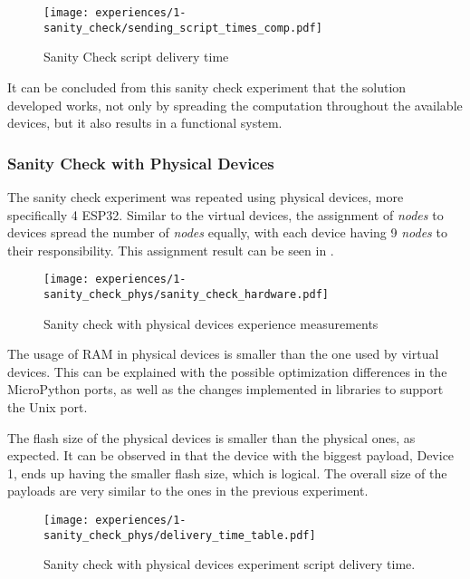 \begin{figure}[h]
\centering
\texttt{[image: experiences/1-sanity\_check/sending\_script\_times\_comp.pdf]}
\caption[Sanity Check script delivery time]{Sanity Check script delivery time}\label{fig:delivery_times_comp}
\end{figure}

It can be concluded from this sanity check experiment that the solution developed works, not only by spreading the computation throughout the available devices, but it also results in a functional system.


\subsubsection{Sanity Check with Physical Devices}\label{sec:sanity_check_phys_exp}

The sanity check experiment was repeated using physical devices, more specifically 4 ESP32. Similar to the virtual devices, the assignment of \textit{nodes} to devices spread the number of \textit{nodes} equally, with each device having 9 \textit{nodes} to their responsibility. This assignment result can be seen in .

\begin{figure}[h]
\centering
\texttt{[image: experiences/1-sanity\_check\_phys/sanity\_check\_hardware.pdf]}
\caption[Sanity check with physical devices experience measurements]{Sanity check with physical devices experience measurements}\label{fig:sanity_check_phys_graph}
\end{figure}

The usage of RAM in physical devices is smaller than the one used by virtual devices. This can be explained with the possible optimization differences in the MicroPython ports, as well as the changes implemented in libraries to support the Unix port.

The flash size of the physical devices is smaller than the physical ones, as expected. It can be observed in  that the device with the biggest payload, Device 1, ends up having the smaller flash size, which is logical. The overall size of the payloads are very similar to the ones in the previous experiment. 

\begin{figure}[h]
\centering
\texttt{[image: experiences/1-sanity\_check\_phys/delivery\_time\_table.pdf]}
\caption[Sanity check with physical devices experiment script delivery time.]{Sanity check with physical devices experiment script delivery time.}\label{fig:sanity_check_phys_delivery_time}
\end{figure}

